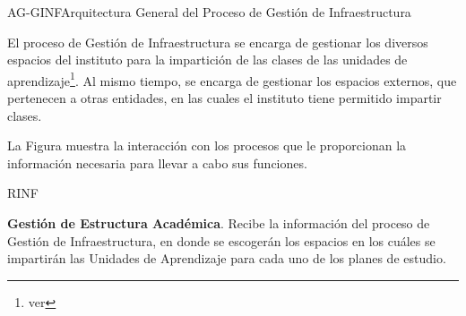 
\begin{Arquitectura}{AG-GINF}{Arquitectura General del Proceso de Gestión de Infraestructura} {
		
		El proceso de Gestión de Infraestructura se encarga de 
		gestionar los diversos espacios del instituto para la impartición de las clases de las unidades de aprendizaje\footnote{ver }. Al mismo tiempo, se encarga de gestionar los espacios externos, que pertenecen a otras entidades, en las cuales el instituto tiene permitido impartir clases.
		
		\noindent La Figura 
		 muestra la interacción con los procesos que le proporcionan la información necesaria para llevar a cabo sus funciones.
		

		
	}{RINF}

\end{Arquitectura}


\begin{ADescripcion}
	\item \textbf{Gestión de Estructura Académica}. Recibe la información del proceso de Gestión de Infraestructura, en donde se escogerán los espacios en los cuáles se impartirán las Unidades de Aprendizaje para cada uno de los planes de estudio.

\end{ADescripcion}

